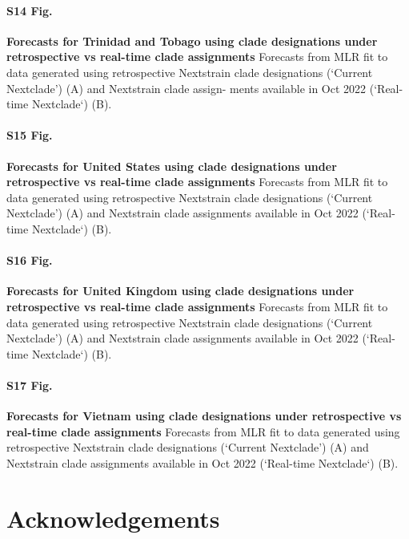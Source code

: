 \documentclass[10pt,letterpaper]{article}
\begin{document}
\paragraph*{S14 Fig.}
\label{fig:S14}
{\bf Forecasts for Trinidad and Tobago using clade designations under retrospective vs real-time clade assignments}
Forecasts from MLR fit to data generated using retrospective Nextstrain clade designations (‘Current Nextclade’) (A) and Nextstrain clade assign-
ments available in Oct 2022 (‘Real-time Nextclade‘) (B).

\paragraph*{S15 Fig.}
\label{fig:S15}
{\bf Forecasts for United States using clade designations under retrospective vs real-time clade assignments}
Forecasts from MLR fit to data generated using retrospective Nextstrain clade designations (‘Current Nextclade’) (A) and Nextstrain clade assignments available
in Oct 2022 (‘Real-time Nextclade‘) (B).

\paragraph*{S16 Fig.}
\label{fig:S16}
{\bf Forecasts for United Kingdom using clade designations under retrospective vs real-time clade assignments }
Forecasts from MLR fit to data generated using retrospective Nextstrain clade designations (‘Current Nextclade’) (A) and Nextstrain clade assignments
available in Oct 2022 (‘Real-time Nextclade‘) (B).

\paragraph*{S17 Fig.}
\label{fig:S17}
{\bf Forecasts for Vietnam using clade designations under retrospective vs real-time clade assignments}
Forecasts from MLR fit to data generated using retrospective Nextstrain clade designations (‘Current Nextclade’) (A) and Nextstrain clade assignments available
in Oct 2022 (‘Real-time Nextclade‘) (B).


\section*{Acknowledgements}
\end{document}
